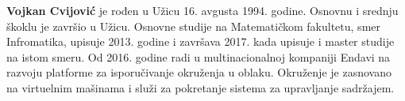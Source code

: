 \documentclass[12pt,oneside]{memoir}
\begin{document}
\begin{biografija}
  \textbf{Vojkan Cvijović} je rođen u Užicu 16. avgusta 1994. godine. Osnovnu i srednju škoklu je završio u Užicu. Osnovne studije na Matematičkom fakultetu, smer Infromatika, upisuje 2013. godine i završava 2017. kada upisuje i master studije na istom smeru. Od 2016. godine radi u multinacionalnoj kompaniji Endavi na razvoju platforme za isporučivanje okruženja u oblaku. Okruženje je zasnovano na virtuelnim mašinama i služi za pokretanje sistema za upravljanje sadržajem.
\end{biografija}
\end{document}
